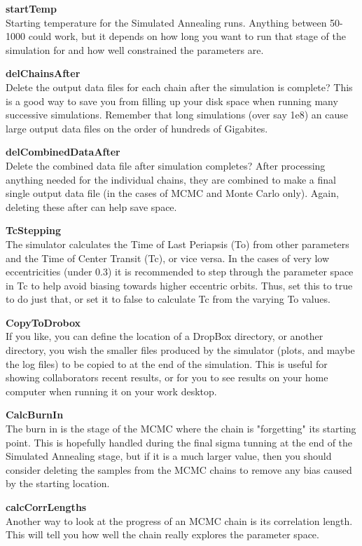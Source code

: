 \documentclass[12pt,preprint]{aastex}
\begin{document}
{\bf startTemp}\\
Starting temperature for the Simulated Annealing runs.  Anything between 50-1000 could work, but it depends on how long you want to run that stage of the simulation for and how well constrained the parameters are.

{\bf delChainsAfter}\\
Delete the output data files for each chain after the simulation is complete?  This is a good way to save you from filling up your disk space when running many successive simulations.  Remember that long simulations (over say 1e8) an cause large output data files on the order of hundreds of Gigabites.

{\bf delCombinedDataAfter}\\
Delete the combined data file after simulation completes?  After processing anything needed for the individual chains, they are combined to make a final single output data file (in the cases of MCMC and Monte Carlo only).  Again, deleting these after can help save space.

{\bf TcStepping}\\
The simulator calculates the Time of Last Periapsis (To) from other parameters and the Time of Center Transit (Tc), or vice versa.  In the cases of very low eccentricities (under 0.3) it is recommended to step through the parameter space in Tc to help avoid biasing towards higher eccentric orbits.  Thus, set this to true to do just that, or set it to false to calculate Tc from the varying To values.

{\bf CopyToDrobox}\\
If you like, you can define the location of a DropBox directory, or another directory, you wish the smaller files produced by the simulator (plots, and maybe the log files) to be copied to at the end of the simulation.  This is useful for showing collaborators recent results, or for you to see results on your home computer when running it on your work desktop.

{\bf CalcBurnIn}\\
The burn in is the stage of the MCMC where the chain is "forgetting" its starting point.  This is hopefully handled during the final sigma tunning at the end of the Simulated Annealing stage, but if it is a much larger value, then you should consider deleting the samples from the MCMC chains to remove any bias caused by the starting location.

{\bf calcCorrLengths}\\
Another way to look at the progress of an MCMC chain is its correlation length.  This will tell you how well the chain really explores the parameter space.
\end{document}
